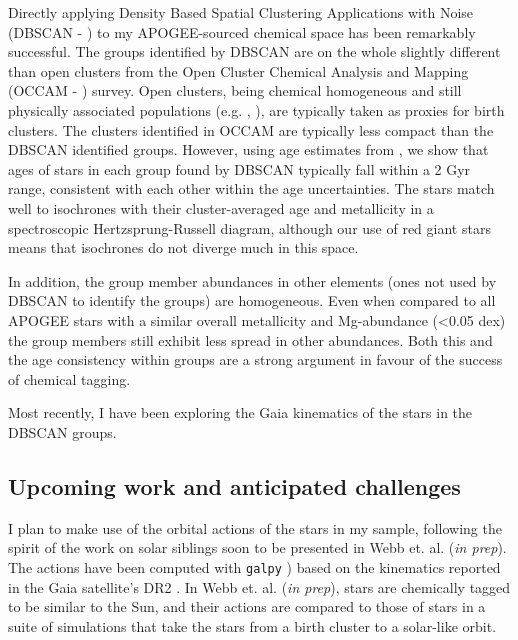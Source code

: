 \documentclass[11pt]{article}
\begin{document}
Directly applying Density Based Spatial Clustering Applications with Noise (DBSCAN - \citealt{Ester1996}) to my APOGEE-sourced chemical space has been remarkably successful. The groups identified by DBSCAN are on the whole slightly different than open clusters from the Open Cluster Chemical Analysis and Mapping	(OCCAM - \citealt{Frinchaboy2003}) survey. Open clusters, being chemical homogeneous and still physically associated populations (e.g. \citealt{DeSilva2006}, \citealt{Bovy2016}), are typically taken as proxies for birth clusters. The clusters identified in OCCAM are typically less compact than the DBSCAN identified groups. However, using age estimates from \citet{Mackereth2019}, we show that ages of stars in each group found by DBSCAN typically fall within a 2 Gyr range, consistent with each other within the age uncertainties. The stars match well to isochrones with their cluster-averaged age and metallicity in a spectroscopic Hertzsprung-Russell diagram, although our use of red giant stars means that isochrones do not diverge much in this space.

In addition, the group member abundances in other elements (ones not used by DBSCAN to identify the groups) are homogeneous. Even when compared to all APOGEE stars with a similar overall metallicity and Mg-abundance (<0.05 dex) the group members still exhibit less spread in other abundances. Both this and the age consistency within groups are a strong argument in favour of the success of chemical tagging.

Most recently, I have been exploring the Gaia \citep{GaiaCollaboration2016} kinematics of the stars in the DBSCAN groups.
    
    \subsection*{Upcoming work and anticipated challenges}
    
    I plan to make use of the orbital actions of the stars in my sample, following the spirit of the work on solar siblings soon to be presented in Webb et. al. (\emph{in prep}). The actions have been computed with \texttt{galpy} \citep{Bovy2015}) based on the kinematics reported in the Gaia satellite's DR2 \citep{GaiaCollaboration2016}. In Webb et. al. (\emph{in prep}), stars are chemically tagged to be similar to the Sun, and their actions are compared to those of stars in a suite of simulations that take the stars from a birth cluster to a solar-like orbit. 
    
\end{document}

